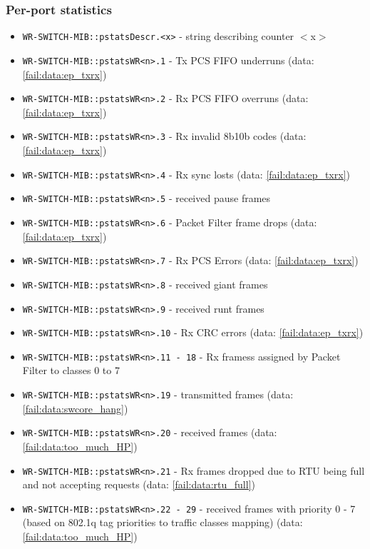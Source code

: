 \subsubsection{Per-port statistics}
\begin{itemize}[leftmargin=0pt]
	\item [] \texttt{WR-SWITCH-MIB::pstatsDescr.<x>} - string describing counter
		$<$x$>$
	\item [] \texttt{WR-SWITCH-MIB::pstatsWR<n>.1} - Tx PCS FIFO underruns (data:
		\ref{fail:data:ep_txrx})
	\item [] \texttt{WR-SWITCH-MIB::pstatsWR<n>.2} - Rx PCS FIFO overruns (data:
		\ref{fail:data:ep_txrx})
	\item [] \texttt{WR-SWITCH-MIB::pstatsWR<n>.3} - Rx invalid 8b10b codes (data:
		\ref{fail:data:ep_txrx})
	\item [] \texttt{WR-SWITCH-MIB::pstatsWR<n>.4} - Rx sync losts (data:
		\ref{fail:data:ep_txrx})
	\item [] \texttt{WR-SWITCH-MIB::pstatsWR<n>.5} - received pause frames
	\item [] \texttt{WR-SWITCH-MIB::pstatsWR<n>.6} - Packet Filter frame drops
		(data: \ref{fail:data:ep_txrx})
	\item [] \texttt{WR-SWITCH-MIB::pstatsWR<n>.7} - Rx PCS Errors (data:
		\ref{fail:data:ep_txrx})
	\item [] \texttt{WR-SWITCH-MIB::pstatsWR<n>.8} - received giant frames
	\item [] \texttt{WR-SWITCH-MIB::pstatsWR<n>.9} - received runt frames
	\item [] \texttt{WR-SWITCH-MIB::pstatsWR<n>.10} - Rx CRC errors (data:
		\ref{fail:data:ep_txrx})
	\item [] \texttt{WR-SWITCH-MIB::pstatsWR<n>.11 - 18} - Rx framess assigned by
		Packet Filter to classes 0 to 7
	\item [] \texttt{WR-SWITCH-MIB::pstatsWR<n>.19} - transmitted frames (data:
		\ref{fail:data:swcore_hang})
	\item [] \texttt{WR-SWITCH-MIB::pstatsWR<n>.20} - received frames (data:
		\ref{fail:data:too_much_HP})
	\item [] \texttt{WR-SWITCH-MIB::pstatsWR<n>.21} - Rx frames dropped due to RTU
		being full and not accepting requests (data: \ref{fail:data:rtu_full})
	\item [] \texttt{WR-SWITCH-MIB::pstatsWR<n>.22 - 29} - received frames with
		priority 0 - 7 (based on 802.1q tag priorities to traffic classes mapping)
		(data: \ref{fail:data:too_much_HP})

\end{itemize}
